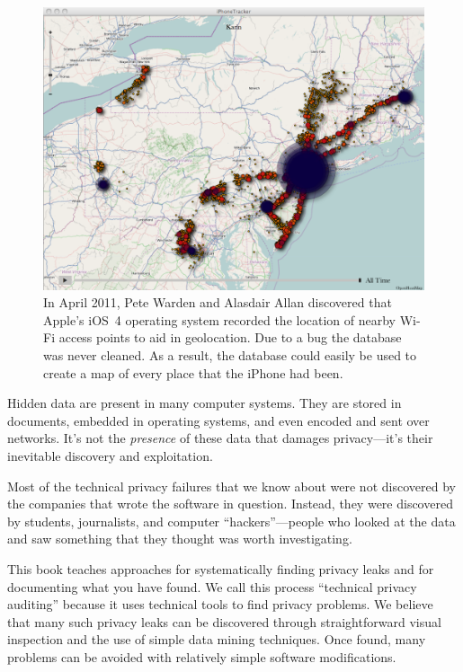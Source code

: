 \begin{figure}
\includegraphics[width=\textwidth]{ch-1/5637893141_ba59f2d989_o.png}
\caption{In April 2011, Pete Warden and Alasdair Allan discovered
that Apple's iOS~4
  operating system recorded the location of nearby Wi-Fi access points
  to aid in geolocation. Due to a bug the database was never
  cleaned. As a result, the database could easily be used to create a
  map of every place that the iPhone had been. }\label{heatmap}
\end{figure}

Hidden data are present in many computer systems. They are stored in
documents, embedded in operating systems, and even encoded and sent over
networks. It's not the \emph{presence} of these data that damages
privacy---it's their inevitable discovery and exploitation.

Most of the technical privacy failures that we know about were not
discovered by the companies that wrote the software in
question. Instead, they were discovered by students,
journalists, and computer ``hackers''---people who looked at the data
and saw something that they thought was worth investigating.

This book teaches approaches for systematically finding privacy
leaks and for documenting what you have found. We call this process
``technical privacy auditing'' because it uses technical tools to find
privacy problems. We believe that many such privacy leaks can be
discovered through straightforward visual inspection and the use of
simple data mining techniques. Once found, many problems can be
avoided with relatively simple software modifications.

